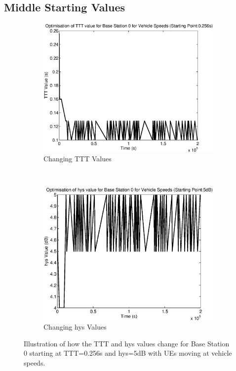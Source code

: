\subsection{Middle Starting Values}\label{ap:veh_mid}
\begin{figure}[H]
        \centering
        \begin{subfigure}[b]{0.49\textwidth}
                \includegraphics[width=\textwidth]{figures/graphs/vehmid/TTT0.eps}
                \caption{Changing TTT Values}
        \end{subfigure}%
        ~ %
        \begin{subfigure}[b]{0.49\textwidth}
                \includegraphics[width=\textwidth]{figures/graphs/vehmid/hys0.eps}
                \caption{Changing hys Values}
        \end{subfigure}
        \caption{Illustration of how the TTT and hys values change for Base Station 0 starting at TTT=0.256s and hys=5dB with UEs moving at vehicle speeds.}
\end{figure}
